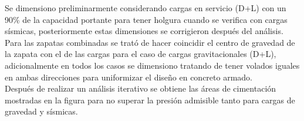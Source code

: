 Se dimensiono preliminarmente considerando cargas en servicio (D+L) con un 90\% de la capacidad portante para tener holgura cuando se verifica con cargas sísmicas, posteriormente estas dimensiones se corrigieron después del análisis.\\
Para las zapatas combinadas se trató de hacer coincidir el centro de gravedad de la zapata con el de las cargas para el caso de cargas gravitacionales (D+L), adicionalmente en todos los casos se dimensiono tratando de tener volados iguales en ambas direcciones para uniformizar el diseño en concreto armado.\\
Después de realizar un análisis iterativo se obtiene las áreas de cimentación mostradas en la figura  para no superar la presión admisible tanto para cargas de gravedad y sísmicas. 